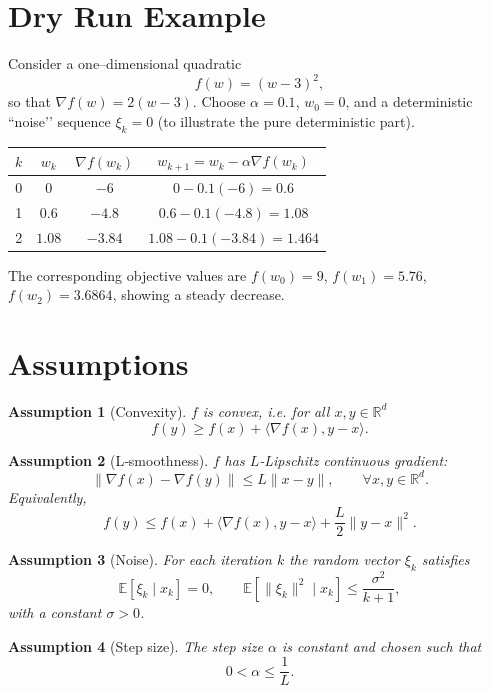 \documentclass{article}
\newtheorem{assumption}{Assumption}
\begin{document}
\section*{Dry Run Example}
Consider a one–dimensional quadratic
\[
f(w)=(w-3)^{2},
\]
so that $\nabla f(w)=2(w-3)$.  Choose $\alpha=0.1$, $w_{0}=0$, and a deterministic “noise’’ sequence $\xi_{k}=0$ (to illustrate the pure deterministic part).  

\begin{center}
\begin{tabular}{c|c|c|c}
$k$ & $w_{k}$ & $\nabla f(w_{k})$ & $w_{k+1}=w_{k}-\alpha\nabla f(w_{k})$ \\ \hline
0 & $0$ & $-6$ & $0-0.1(-6)=0.6$ \\
1 & $0.6$ & $-4.8$ & $0.6-0.1(-4.8)=1.08$ \\
2 & $1.08$ & $-3.84$ & $1.08-0.1(-3.84)=1.464$ \\
\end{tabular}
\end{center}
The corresponding objective values are $f(w_{0})=9$, $f(w_{1})=5.76$, $f(w_{2})=3.6864$, showing a steady decrease.

\newpage

\section*{Assumptions}
\begin{assumption}[Convexity]\label{ass:convex}
$f$ is convex, i.e. for all $x,y\in\mathbb{R}^{d}$
\[
f(y)\ge f(x)+\langle\nabla f(x),y-x\rangle .
\]
\end{assumption}
\begin{assumption}[L‑smoothness]\label{ass:smooth}
$f$ has $L$‑Lipschitz continuous gradient:
\[
\|\nabla f(x)-\nabla f(y)\|\le L\|x-y\|,\qquad\forall x,y\in\mathbb{R}^{d}.
\]
Equivalently,
\[
f(y)\le f(x)+\langle\nabla f(x),y-x\rangle+\frac{L}{2}\|y-x\|^{2}.
\]
\end{assumption}
\begin{assumption}[Noise]\label{ass:noise}
For each iteration $k$ the random vector $\xi_{k}$ satisfies
\[
\mathbb{E}[\xi_{k}\mid x_{k}]=0,\qquad 
\mathbb{E}\!\left[\|\xi_{k}\|^{2}\mid x_{k}\right]\le \frac{\sigma^{2}}{k+1},
\]
with a constant $\sigma>0$.
\end{assumption}
\begin{assumption}[Step size]\label{ass:stepsize}
The step size $\alpha$ is constant and chosen such that
\[
0<\alpha\le\frac{1}{L}.
\]
\end{assumption}
\end{document}
